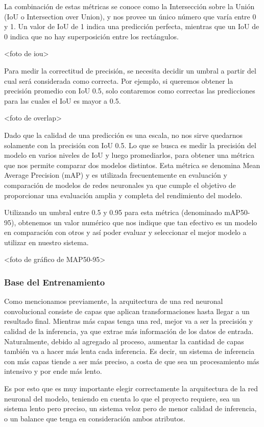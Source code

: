 \documentclass[a4paper]{article}
\begin{document}
La combinación de estas métricas se conoce como la Intersección sobre la Unión (IoU o Intersection over Union), y nos provee un único número que varía entre 0 y 1. Un valor de IoU de 1 indica una predicción perfecta, mientras que un IoU de 0 indica que no hay superposición entre los rectángulos.

<foto de iou>

Para medir la correctitud de precisión, se necesita decidir un umbral a partir del cual será considerada como correcta. Por ejemplo, si queremos obtener la precisión promedio con IoU 0.5, solo contaremos como correctas las predicciones para las cuales el IoU es mayor a 0.5.

<foto de overlap>

Dado que la calidad de una predicción es una escala, no nos sirve quedarnos solamente con la precisión con IoU 0.5. Lo que se busca es medir la precisión del modelo en varios niveles de IoU y luego promediarlos, para obtener una métrica que nos permite comparar dos modelos distintos. Esta métrica se denomina Mean Average Precision (mAP) y es utilizada frecuentemente en evaluación y comparación de modelos de redes neuronales ya que cumple el objetivo de proporcionar una evaluación amplia y completa del rendimiento del modelo.

Utilizando un umbral entre 0.5 y 0.95 para esta métrica (denominado mAP50-95), obtenemos un valor numérico que nos indique que tan efectivo es un modelo en comparación con otros y así poder evaluar y seleccionar el mejor modelo a utilizar en nuestro sistema.

<foto de gráfico de MAP50-95>

\subsubsection{Base del Entrenamiento}

Como mencionamos previamente, la arquitectura de una red neuronal convolucional consiste de capas que aplican transformaciones hasta llegar a un resultado final. Mientras más capas tenga una red, mejor va a ser la precisión y calidad de la inferencia, ya que extrae más información de los datos de entrada. Naturalmente, debido al agregado al proceso, aumentar la cantidad de capas también va a hacer más lenta cada inferencia. Es decir, un sistema de inferencia con más capas tiende a ser más preciso, a costa de que sea un procesamiento más intensivo y por ende más lento.

Es por esto que es muy importante elegir correctamente la arquitectura de la red neuronal del modelo, teniendo en cuenta lo que el proyecto requiere, sea un sistema lento pero preciso, un sistema veloz pero de menor calidad de inferencia, o un balance que tenga en consideración ambos atributos.
\end{document}
